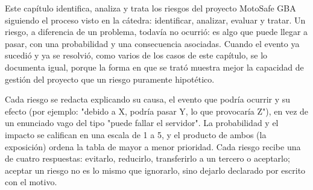 Este capítulo identifica, analiza y trata los riesgos del proyecto
MotoSafe GBA siguiendo el proceso visto en la cátedra: identificar,
analizar, evaluar y tratar. Un riesgo, a diferencia de un problema,
todavía no ocurrió: es algo que puede llegar a pasar, con una
probabilidad y una consecuencia asociadas. Cuando el evento ya sucedió y
ya se resolvió, como varios de los casos de este capítulo, se lo
documenta igual, porque la forma en que se trató muestra mejor la
capacidad de gestión del proyecto que un riesgo puramente hipotético.

Cada riesgo se redacta explicando su causa, el evento que podría ocurrir
y su efecto (por ejemplo: "debido a X, podría pasar Y, lo que provocaría
Z"), en vez de un enunciado vago del tipo "puede fallar el servidor". La
probabilidad y el impacto se califican en una escala de 1 a 5, y el
producto de ambos (la exposición) ordena la tabla de mayor a menor
prioridad. Cada riesgo recibe una de cuatro respuestas: evitarlo,
reducirlo, transferirlo a un tercero o aceptarlo; aceptar un riesgo no
es lo mismo que ignorarlo, sino dejarlo declarado por escrito con el
motivo.

